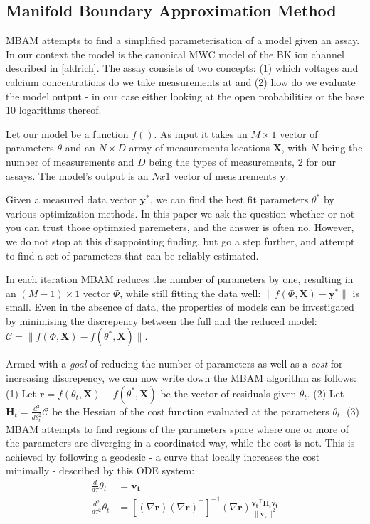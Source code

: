 \documentclass[10pt]{amsart}
\begin{document}
\subsection{Manifold Boundary Approximation Method}
MBAM attempts to find a simplified parameterisation of a model given an assay. In our context the model is the canonical MWC model of the BK ion channel described in \eqref{aldrich}. The assay consists of two concepts: (1) which voltages and calcium concentrations do we take measurements at and (2) how do we evaluate the model output - in our case either looking at the open probabilities or the base 10 logarithms thereof.

Let our model be a function $f()$. As input it takes an $M\times 1$ vector of parameters $\theta$ and an $N\times D$ array of measurements locations $\mathbf{X}$, with $N$ being the number of measurements and $D$ being the types of measurements, 2 for our assays.
The model's output is an $Nx1$ vector of measurements $\mathbf{y}$.

Given a measured data vector $\mathbf{y^*}$, we can find the best fit parameters $\theta^*$ by various optimization methods. In this paper we ask the question whether or not you can trust those optimzied paremeters, and the answer is often no. However, we do not stop at this disappointing finding, but go a step further, and attempt to find a set of parameters that can be reliably estimated.

In each iteration MBAM reduces the number of parameters by one, resulting in an $(M-1) \times 1$ vector $\Phi$, while still fitting the data well: $\|f(\Phi, \mathbf{X}) - \mathbf{y^*}\|$ is small. Even in the absence of data, the properties of models can be investigated by minimising the discrepency between the full and the reduced model: $\mathcal{C} = \|f(\Phi, \mathbf{X}) - f(\theta^*, \mathbf{X})\|$.



Armed with a \textit{goal} of reducing the number of parameters as well as a \textit{cost} for increasing discrepency, we can now write down the MBAM algorithm as follows: 
(1) Let $\mathbf{r} = f(\theta_t, \mathbf{X}) - f(\theta^*, \mathbf{X})$ be the vector of residuals given $\theta_t$. 
(2) Let $\mathbf{H}_t = \frac{d^2}{d\theta_t^2}\mathcal{C}$ be the Hessian of the cost function evaluated at the parameters $\theta_t$.
(3) MBAM attempts to find regions of the parameters space where one or more of the parameters are diverging in a coordinated way, while the cost is not. This is achieved by following a geodesic - a curve that locally increases the cost minimally - described by this ODE system:
	\begin{align}
		\frac{d}{d\tau}\theta_t&=\mathbf{v_t} \\
		\frac{d^2}{d\tau^2}\theta_t&=[(\nabla \mathbf{r}) (\nabla \mathbf{r})^\top]^{-1} (\nabla \mathbf{r}) \frac{\mathbf{v_t}^\top \mathbf{H}_t \mathbf{v_t}}{\|\mathbf{v_t}\|^2}
	\end{align}
\end{document}
